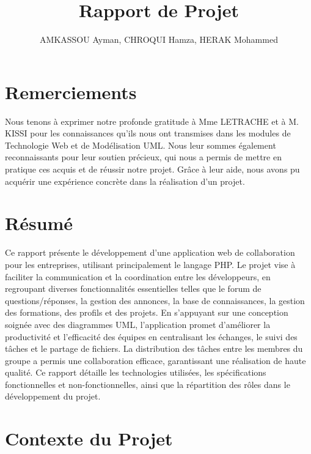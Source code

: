 \documentclass{article}
\title{Rapport de Projet}
\author{AMKASSOU Ayman, CHROQUI Hamza, HERAK Mohammed}
\begin{document}
    \setcounter{page}{2} 
    \tableofcontents
    \newpage

    \listoffigures

    \listoftables
    \newpage

    \section{Remerciements}
        Nous tenons à exprimer notre profonde gratitude à Mme LETRACHE et à M. KISSI pour les connaissances qu'ils nous ont transmises dans les modules de Technologie Web et de Modélisation UML. Nous leur sommes également reconnaissants pour leur soutien précieux, qui nous a permis de mettre en pratique ces acquis et de réussir notre projet. Grâce à leur aide, nous avons pu acquérir une expérience concrète dans la réalisation d'un projet.
    
    \newpage
    
    \section{Résumé}
        Ce rapport présente le développement d'une application web de collaboration pour les entreprises, utilisant principalement le langage PHP. 
        Le projet vise à faciliter la communication et la coordination entre les développeurs, en regroupant diverses fonctionnalités essentielles telles que le forum de questions/réponses, 
        la gestion des annonces, la base de connaissances, la gestion des formations, des profils et des projets. En s'appuyant sur une conception soignée avec des diagrammes UML, 
        l'application promet d'améliorer la productivité et l'efficacité des équipes en centralisant les échanges, le suivi des tâches et le partage de fichiers. 
        La distribution des tâches entre les membres du groupe a permis une collaboration efficace, garantissant une réalisation de haute qualité. 
        Ce rapport détaille les technologies utilisées, les spécifications fonctionnelles et non-fonctionnelles, ainsi que la répartition des rôles dans le développement du projet.
    \newpage
    \section{Contexte du Projet}
\end{document}
